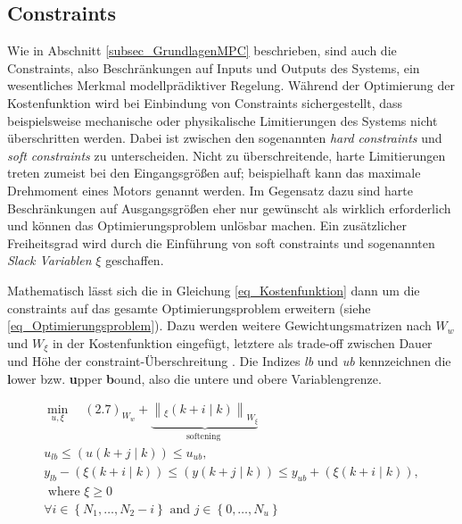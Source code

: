 \subsection{Constraints} \label{subsec_Constraints}
Wie in Abschnitt \ref{subsec_GrundlagenMPC} beschrieben, sind auch die Constraints, also Beschränkungen auf Inputs und Outputs des Systems, ein wesentliches Merkmal modellprädiktiver Regelung.
Während der Optimierung der Kostenfunktion wird bei Einbindung von Constraints sichergestellt, dass beispielsweise mechanische oder physikalische Limitierungen des Systems nicht überschritten werden.
Dabei ist zwischen den sogenannten \textit{hard constraints} und \textit{soft constraints} zu unterscheiden.
Nicht zu überschreitende, harte Limitierungen treten zumeist bei den Eingangsgrößen auf; beispielhaft kann das maximale Drehmoment eines Motors genannt werden.
Im Gegensatz dazu sind harte Beschränkungen auf Ausgangsgrößen eher nur gewünscht als wirklich erforderlich und können das Optimierungsproblem unlösbar machen.
Ein zusätzlicher Freiheitsgrad wird durch die Einführung von soft constraints und sogenannten \textit{Slack Variablen} $\xi$ geschaffen. \cite[S.4]{Schwenzer}

Mathematisch lässt sich die in Gleichung \ref{eq_Kostenfunktion} dann um die constraints auf das gesamte Optimierungsproblem erweitern (siehe \ref{eq_Optimierungsproblem}).
Dazu werden weitere Gewichtungsmatrizen nach \cite[S.4]{Schwenzer}$W_w$ und $W_\xi$ in der Kostenfunktion eingefügt, letztere als trade-off zwischen Dauer und Höhe der constraint-Überschreitung \cite{Rawlings}.
Die Indizes \textit{lb} und \textit{ub} kennzeichnen die \textbf{l}ower bzw. \textbf{u}pper \textbf{b}ound, also die untere und obere Variablengrenze.

\begin{equation} \label{eq_Optimierungsproblem}
\begin{gathered}
    \min_{u, \xi} \quad (2.7)_{W_w}+\underbrace{\left\|_{\xi}(k+i \mid k)\right\|_{W_{\xi}}}_{\text {softening }} \qquad\\
    u_{l b} \leq(u(k+j \mid k)) \leq u_{u b}, \\
    y_{l b}-(\xi(k+i \mid k)) \leq(y(k+j \mid k)) \leq y_{u b}+(\xi(k+i \mid k)), \\
    \text { where } \xi \geq 0 \\
    \forall i \in\left\{N_1, \ldots, N_2-i\right\} \text { and } j \in\left\{0, \ldots, N_u\right\}
\end{gathered}
\end{equation}

